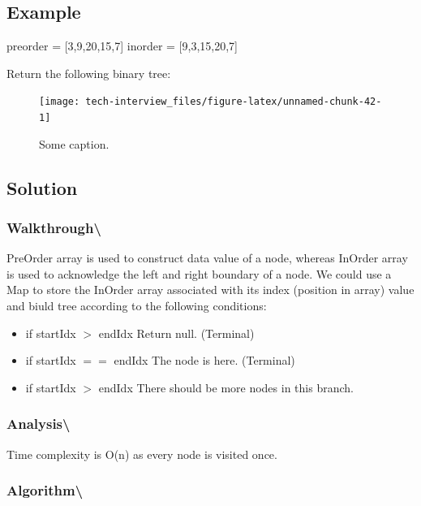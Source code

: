 \documentclass[]{book}
\providecommand{\tightlist}{%
  \setlength{\itemsep}{0pt}\setlength{\parskip}{0pt}}
\begin{document}
\hypertarget{example-76}{%
\subsection{Example}\label{example-76}}

preorder = {[}3,9,20,15,7{]}
inorder = {[}9,3,15,20,7{]}

Return the following binary tree:

\begin{figure}
\texttt{[image: tech-interview\_files/figure-latex/unnamed-chunk-42-1]} \caption{Some caption.}\label{fig:unnamed-chunk-42}
\end{figure}

\hypertarget{solution-56}{%
\subsection{Solution}\label{solution-56}}

\hypertarget{walkthrough-90}{%
\subsubsection{Walkthrough\textbackslash{}}\label{walkthrough-90}}

PreOrder array is used to construct data value of a node, whereas InOrder array is used to acknowledge the left and right boundary
of a node. We could use a Map to store the InOrder array associated with its index (position in array) value and biuld
tree according to the following conditions:

\begin{itemize}
\tightlist
\item
  if startIdx \(>\) endIdx Return null. (Terminal)
\item
  if startIdx \(==\) endIdx The node is here. (Terminal)
\item
  if startIdx \(>\) endIdx There should be more nodes in this branch.
\end{itemize}

\hypertarget{analysis-97}{%
\subsubsection{Analysis\textbackslash{}}\label{analysis-97}}

Time complexity is O(n) as every node is visited once.

\hypertarget{algorithm-99}{%
\subsubsection{Algorithm\textbackslash{}}\label{algorithm-99}}
\end{document}
